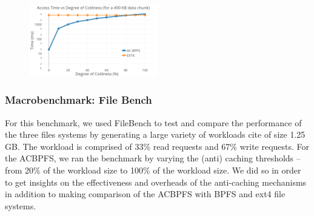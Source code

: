 \begin{figure}
\centering
\vspace{-0.1in}
\includegraphics[width=0.5\textwidth]{figs/coldness.png}
\vspace{-0.1in}
\end{figure}

 
\subsubsection{Macrobenchmark: File Bench}
 For this benchmark, we used FileBench to test and compare the performance of the three files systems by generating a large variety of workloads {cite} of size 1.25 GB. The workload is comprised of 33\% read requests and 67\% write requests. For the AC\-BPFS, we ran the benchmark by varying the (anti) caching thresholds – from 20\% of the workload size to 100\% of the workload size. We did so in order to get insights on the effectiveness and overheads of the anti-caching mechanisms in addition to making comparison of the AC\-BPFS with BPFS and ext4 file systems.


